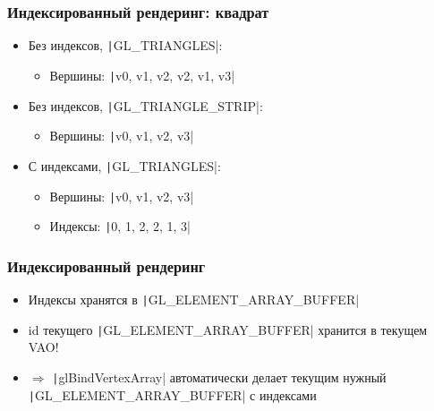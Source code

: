 \documentclass[10pt]{beamer}
\begin{document}
\begin{frame}[fragile]
\frametitle{Индексированный рендеринг: квадрат}
\begin{center}
\end{center}
\pause
\begin{itemize}
\item Без индексов, \texttt|GL_TRIANGLES|:
\begin{itemize}
\item Вершины: \texttt|v0, v1, v2, v2, v1, v3|
\end{itemize}
\pause
\item Без индексов, \texttt|GL_TRIANGLE_STRIP|:
\begin{itemize}
\item Вершины: \texttt|v0, v1, v2, v3|
\end{itemize}
\pause
\item С индексами, \texttt|GL_TRIANGLES|:
\begin{itemize}
\item Вершины: \texttt|v0, v1, v2, v3|
\item Индексы: \texttt|0, 1, 2, 2, 1, 3|
\end{itemize}
\end{itemize}
\end{frame}

\begin{frame}[fragile]
\frametitle{Индексированный рендеринг}
\begin{itemize}
\item Индексы хранятся в \texttt|GL_ELEMENT_ARRAY_BUFFER|
\pause
\item id текущего \texttt|GL_ELEMENT_ARRAY_BUFFER| хранится {\color{red}в текущем VAO!}
\pause
\item \begin{math}\Longrightarrow\end{math} \texttt|glBindVertexArray| автоматически делает текущим нужный \texttt|GL_ELEMENT_ARRAY_BUFFER| с индексами
\end{itemize}
\end{frame}
\end{document}
